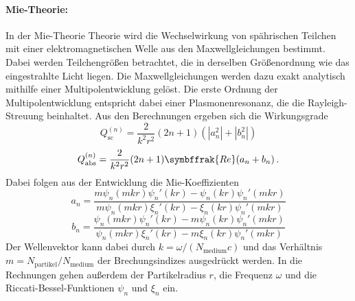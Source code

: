 \paragraph{Mie-Theorie:}
In der Mie-Theorie Theorie wird die Wechselwirkung von spährischen Teilchen mit einer elektromagnetischen Welle aus den Maxwellgleichungen bestimmt. Dabei werden Teilchengrößen betrachtet, die in derselben Größenordnung wie das eingestrahlte Licht liegen. Die Maxwellgleichungen werden dazu exakt analytisch mithilfe einer Multipolentwicklung gelöst. Die erste Ordnung der Multipolentwicklung entspricht dabei einer Plasmonenresonanz, die die Rayleigh-Streuung beinhaltet. Aus den Berechnungen ergeben sich die Wirkungsgrade
\begin{equation}
  Q^{(n)}_{\text{sc}} = \frac{2}{k^2r^2} (2n+1)(|a_n^2| + |b_n^2|)
  \label{eqn:sc}
\end{equation}
\begin{equation}
  Q^{(n)}_{\text{abs}} = \frac{2}{k^2r^2} (2n+1) \symbffrak{Re}(a_n+b_n)\,.
  \label{eqn:abs}
\end{equation}
Dabei folgen aus der Entwicklung die Mie-Koeffizienten
\begin{equation}
  a_n = \frac{m\psi_n(mkr)\psi_n'(kr)-\psi_n(kr)\psi_n'(mkr)}{m\psi_n(mkr)\xi_n'(kr)-\xi_n(kr)\psi_n'(mkr)}
\end{equation}
\begin{equation}
  b_n = \frac{\psi_n(mkr)\psi_n'(kr)-m\psi_n(kr)\psi_n'(mkr)}{\psi_n(mkr)\xi_n'(kr)-m\xi_n(kr)\psi_n'(mkr)}
\end{equation}
Der Wellenvektor kann dabei durch  $k=\omega/(N_{\text{medium}}c)$ und das Verhältnis $m = N_\text{partikel}/N_\text{medium}$ der Brechungsindizes ausgedrückt werden. In die Rechnungen gehen außerdem der Partikelradius $r$, die Frequenz $\omega$ und die Riccati-Bessel-Funktionen $\psi_n$ und $\xi_n$ ein. \cite{anleitung} \cite{hoeflich}

